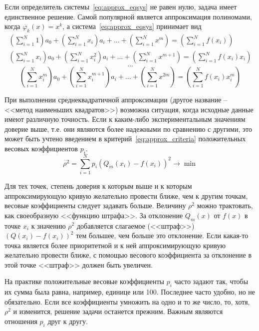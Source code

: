 Если определитель системы~\eqref{eq:approx_eqsys} не равен нулю, задача
имеет единственное решение. Самой популярной является аппроксимация полиномами, когда
$\varphi_k(x) = x^k$, а система~\eqref{eq:approx_eqsys} принимает вид
\begin{gather*}
    \left( \sum_{i=1}^{N} 1 \right)a_0 + \left( \sum_{i=1}^{N} x_i \right)a_i + \dots + \left( \sum_{i=1}^{N} x^m \right) = \left( \sum_{i=1}^{N} f(x_i) \right)\\
    \left( \sum_{i=1}^{N} x_i \right)a_0 + \left( \sum_{i=1}^{N} x_i^2 \right)a_i + \dots + \left( \sum_{i=1}^{N} x^{m+1} \right) = \left( \sum_{i=1}^{N} f(x_i)x_i \right)
\end{gather*}
\begin{equation}
    \dots
\end{equation}
\begin{equation*}
    \left( \sum_{i=1}^{N} x_i^m \right)a_0 + \left( \sum_{i=1}^{N} x_i^{m+1} \right)a_i + \dots + \left( \sum_{i=1}^{N} x^{2m} \right) = \left( \sum_{i=1}^{N} f(x_i)x_i^m \right)
\end{equation*}

При выполнении среднеквадратичной аппроксимации (другое название -- <<метод наименьших квадратов>>)
возможна ситуация, когда исходные данные имеют различную точность. Если к каким-либо экспериментальным
значениям доверие выше, т.е. они являются более надежными по сравнению с другими, это может быть
учтено введением в критерий~\eqref{eq:approx_criteria} положительных весовых коэффициентов $p_i$.
\begin{equation}
    \rho^2 = \sum_{i=1}^{N} p_i \left( Q_m(x_i) - f(x_i) \right)^2 \rightarrow \min \label{eq:approx_with_p}
\end{equation}

Для тех точек, степень доверия к которым выше и к которым аппроксимирующую кривую желательно
провести ближе, чем к другим точкам, весовые коэффициенты следует задавать больше. Величину
$\rho^2$ можно трактовать, как своеобразную <<функцию штрафа>>. За отклонение $Q_m(x)$ от
$f(x)$ в точке $x_i$ к значению $\rho^2$ добавляется слагаемое (<<штраф>>) $\left( Q(x_i) - f(x_i) \right)^2$
тем большее, чем больше это отклонение. Если какая-то точка является более приоритетной
и к ней аппроксимирующую кривую желательно провести ближе, с помощью весового коэффициента
за отклонение в этой точке <<штраф>> должен быть увеличен.

На практике положительные весовые коэффициенты $p_i$ часто задают так, чтобы их сумма была
равна, например, единице или 100. Последнее часто удобно, но не обязательно. Если все коэффициенты
умножить на одно и то же число, то, хотя, $\rho^2$ и изменится, решение задачи останется прежним.
Важным являются отношения $p_i$ друг к другу.
